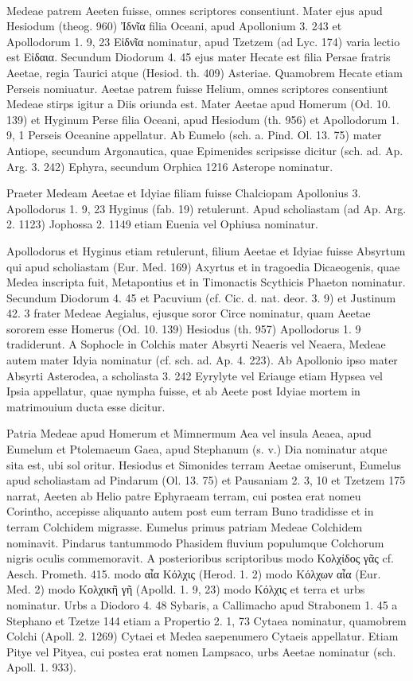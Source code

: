 \documentclass[a4paper, 11pt, oneside, polutonikogreek, german]{article}
\begin{document}
\paragraph{}
Medeae patrem Aeeten fuisse, omnes scriptores consentiunt. Mater ejus apud Hesiodum (theog. 960) Ἰδνῖα filia Oceani, apud Apollonium 3. 243 et Apollodorum 1. 9, 23 Εἰδνῖα nominatur, apud Tzetzem (ad Lyc. 174) varia lectio est Εἰδαια. Secundum Diodorum 4. 45 ejus mater Hecate est filia Persae fratris Aeetae, regia Taurici atque (Hesiod. th. 409) Asteriae. Quamobrem Hecate etiam Perseis nomiuatur. Aeetae patrem fuisse Helium, omnes scriptores consentiunt Medeae stirps igitur a Diis oriunda est. Mater Aeetae apud Homerum (Od. 10. 139) et Hyginum Perse filia Oceani, apud Hesiodum (th. 956) et Apollodorum 1. 9, 1 Perseis Oceanine appellatur. Ab Eumelo (sch. a. Pind. Ol. 13. 75) mater Antiope, secundum Argonautica, quae Epimenides scripsisse dicitur (sch. ad. Ap. Arg. 3. 242) Ephyra, secundum Orphica 1216 Asterope nominatur.

Praeter Medeam Aeetae et Idyiae filiam fuisse Chalciopam Apollonius 3. Apollodorus 1. 9, 23 Hyginus (fab. 19) retulerunt. Apud scholiastam (ad Ap. Arg. 2. 1123) Jophossa 2. 1149 etiam Euenia vel Ophiusa nominatur.

Apollodorus et Hyginus etiam retulerunt, filium Aeetae et Idyiae fuisse Absyrtum qui apud scholiastam (Eur. Med. 169) Axyrtus et in tragoedia Dicaeogenis, quae Medea inscripta fuit, Metapontius et in Timonactis Scythicis Phaeton nominatur. Secundum Diodorum 4. 45 et Pacuvium (cf. Cic. d. nat. deor. 3. 9) et Justinum 42. 3 frater Medeae Aegialus, ejusque soror Circe nominatur, quam Aeetae sororem esse Homerus (Od. 10. 139) Hesiodus (th. 957) Apollodorus 1. 9 tradiderunt. A Sophocle in Colchis mater Absyrti Neaeris vel Neaera, Medeae autem mater Idyia nominatur (cf. sch. ad. Ap. 4. 223). Ab Apollonio ipso mater Absyrti Asterodea, a scholiasta 3. 242 Eyrylyte vel Eriauge etiam Hypsea vel Ipsia appellatur, quae nympha fuisse, et ab Aeete post Idyiae mortem in matrimouium ducta esse dicitur.

Patria Medeae apud Homerum et Mimnermum Aea vel insula Aeaea, apud Eumelum et Ptolemaeum Gaea, apud Stephanum (s. v.) Dia nominatur atque sita est, ubi sol oritur. Hesiodus et Simonides terram Aeetae omiserunt, Eumelus apud scholiastam ad Pindarum (Ol. 13. 75) et Pausaniam 2. 3, 10 et Tzetzem 175 narrat, Aeeten ab Helio patre Ephyraeam terram, cui postea erat nomeu Corintho, accepisse aliquanto autem post eum terram Buno tradidisse et in terram Colchidem migrasse. Eumelus primus patriam Medeae Colchidem nominavit. Pindarus tantummodo Phasidem fluvium populumque Colchorum nigris oculis commemoravit. A posterioribus scriptoribus modo Κολχίδος γᾶς cf. Aesch. Prometh. 415. modo αἶα Κόλχις (Herod. 1. 2) modo Κόλχων αἶα (Eur. Med. 2) modo Κολχικῆ γῆ (Apolld. 1. 9, 23) modo Κόλχις et terra et urbs nominatur. Urbs a Diodoro 4. 48 Sybaris, a Callimacho apud Strabonem 1. 45 a Stephano et Tzetze 144 etiam a Propertio 2. 1, 73 Cytaea nominatur, quamobrem Colchi (Apoll. 2. 1269) Cytaei et Medea saepenumero Cytaeis appellatur. Etiam Pitye vel Pityea, cui postea erat nomen Lampsaco, urbs Aeetae nominatur (sch. Apoll. 1. 933).
\end{document}
